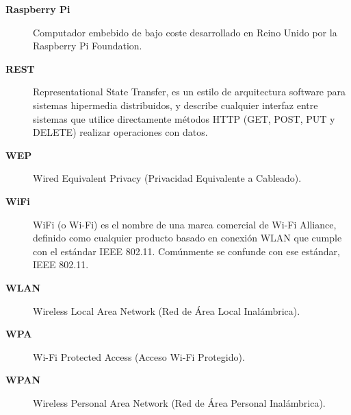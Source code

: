 \begin{description}
    \item[\textbf{Raspberry Pi}] Computador embebido de bajo coste desarrollado en Reino Unido por la Raspberry Pi Foundation.
    \item[\textbf{REST}] Representational State Transfer, es un estilo de arquitectura software para sistemas hipermedia distribuidos, y describe cualquier interfaz entre sistemas que utilice directamente métodos HTTP (GET, POST, PUT y DELETE) realizar operaciones con datos.
    \item[\textbf{WEP}] Wired Equivalent Privacy (Privacidad Equivalente a Cableado).
    \item[\textbf{WiFi}] WiFi (o Wi-Fi) es el nombre de una marca comercial de Wi-Fi Alliance, definido como cualquier producto basado en conexión WLAN que cumple con el estándar IEEE 802.11. Comúnmente se confunde con ese estándar, IEEE 802.11.
    \item[\textbf{WLAN}] Wireless Local Area Network (Red de Área Local Inalámbrica).
    \item[\textbf{WPA}] Wi-Fi Protected Access (Acceso Wi-Fi Protegido).
    \item[\textbf{WPAN}] Wireless Personal Area Network (Red de Área Personal Inalámbrica).
\end{description}